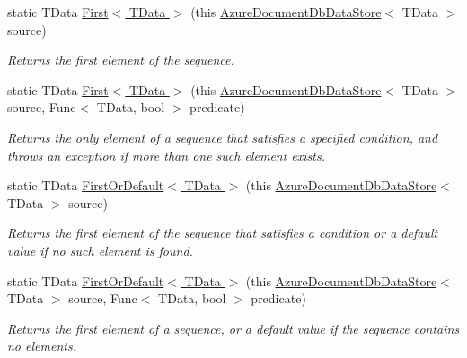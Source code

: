 \begin{DoxyCompactItemize}
static T\+Data \hyperlink{classSystem_1_1Linq_1_1AzureDocumentDbDataStoreExtensions_af216b6d4045dc5bb33fc0c4c36b7a67e}{First$<$ T\+Data $>$} (this \hyperlink{classCqrs_1_1Azure_1_1DocumentDb_1_1DataStores_1_1AzureDocumentDbDataStore}{Azure\+Document\+Db\+Data\+Store}$<$ T\+Data $>$ source)
\begin{DoxyCompactList}\small\item\em Returns the first element of the sequence. \end{DoxyCompactList}\item 
static T\+Data \hyperlink{classSystem_1_1Linq_1_1AzureDocumentDbDataStoreExtensions_aa9bf7da64ecd097ff4270abc3592b56e}{First$<$ T\+Data $>$} (this \hyperlink{classCqrs_1_1Azure_1_1DocumentDb_1_1DataStores_1_1AzureDocumentDbDataStore}{Azure\+Document\+Db\+Data\+Store}$<$ T\+Data $>$ source, Func$<$ T\+Data, bool $>$ predicate)
\begin{DoxyCompactList}\small\item\em Returns the only element of a sequence that satisfies a specified condition, and throws an exception if more than one such element exists. \end{DoxyCompactList}\item 
static T\+Data \hyperlink{classSystem_1_1Linq_1_1AzureDocumentDbDataStoreExtensions_a5508e54e8c57884a4d220f6943dd356d}{First\+Or\+Default$<$ T\+Data $>$} (this \hyperlink{classCqrs_1_1Azure_1_1DocumentDb_1_1DataStores_1_1AzureDocumentDbDataStore}{Azure\+Document\+Db\+Data\+Store}$<$ T\+Data $>$ source)
\begin{DoxyCompactList}\small\item\em Returns the first element of the sequence that satisfies a condition or a default value if no such element is found. \end{DoxyCompactList}\item 
static T\+Data \hyperlink{classSystem_1_1Linq_1_1AzureDocumentDbDataStoreExtensions_ae3870009eab2cb1bf22b447d9fa51ec8}{First\+Or\+Default$<$ T\+Data $>$} (this \hyperlink{classCqrs_1_1Azure_1_1DocumentDb_1_1DataStores_1_1AzureDocumentDbDataStore}{Azure\+Document\+Db\+Data\+Store}$<$ T\+Data $>$ source, Func$<$ T\+Data, bool $>$ predicate)
\begin{DoxyCompactList}\small\item\em Returns the first element of a sequence, or a default value if the sequence contains no elements. \end{DoxyCompactList}\end{DoxyCompactItemize}


